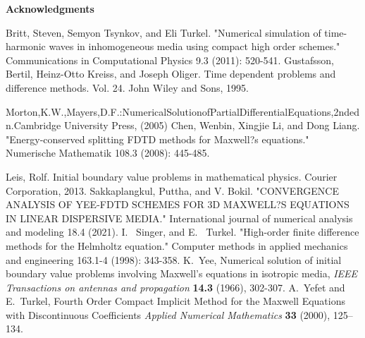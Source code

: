 \documentclass[12pt,reqno]{amsart}
\theoremstyle{definition}
\numberwithin{equation}{section}
\begin{document}
			\begin{center}
				{\bf Acknowledgments}
			\end{center}
			\begin{thebibliography}{99}
				
				
				Britt, Steven, Semyon Tsynkov, and Eli Turkel. "Numerical simulation of time-harmonic waves in inhomogeneous media using compact high order schemes." Communications in Computational Physics 9.3 (2011): 520-541.		
Gustafsson, Bertil, Heinz-Otto Kreiss, and Joseph Oliger. Time dependent problems and difference methods. Vol. 24. John Wiley and Sons, 1995.
			
				Morton,K.W.,Mayers,D.F.:NumericalSolutionofPartialDifferentialEquations,2ndedn.Cambridge
				University Press, (2005)
				Chen, Wenbin, Xingjie Li, and Dong Liang. "Energy-conserved splitting FDTD methods for Maxwell?s equations." Numerische Mathematik 108.3 (2008): 445-485.
				
				Leis, Rolf. Initial boundary value problems in mathematical physics. Courier Corporation, 2013.
				Sakkaplangkul, Puttha, and V. Bokil. "CONVERGENCE ANALYSIS OF YEE-FDTD SCHEMES FOR 3D MAXWELL?S EQUATIONS IN LINEAR DISPERSIVE MEDIA." International journal of numerical analysis and modeling 18.4 (2021).	
				I. ~Singer, and E.~ Turkel. "High-order finite difference methods for the Helmholtz equation." Computer methods in applied mechanics and engineering 163.1-4 (1998): 343-358.					
				K.~Yee, Numerical solution of initial boundary value problems involving Maxwell's equations in isotropic media, {\em IEEE Transactions on antennas and propagation} {\bf 14.3} (1966), 302-307.
				A.~Yefet and E.~Turkel,
				Fourth Order Compact Implicit Method for the Maxwell Equations with Discontinuous Coefficients
				{\em Applied Numerical Mathematics}  {\bf 33} (2000), 125--134.
			\end{thebibliography}
		
\end{document}
